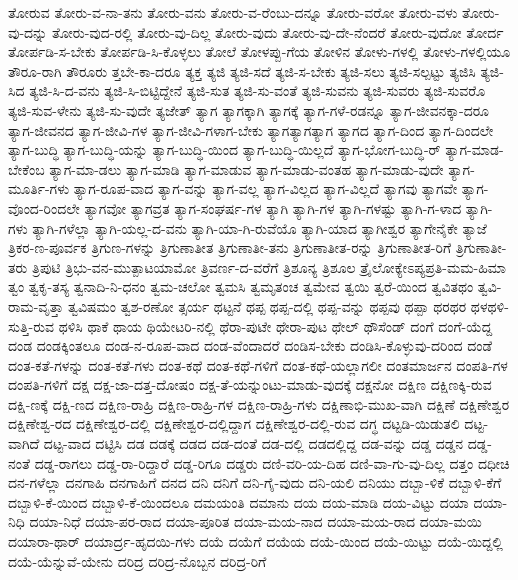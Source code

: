 {ತೋರುವ
ತೋರು-ವ-ನಾ-ತನು
ತೋರು-ವನು
ತೋರು-ವ-ರೆಂಬು-ದನ್ನೂ
ತೋರು-ವರೋ
ತೋರು-ವಳು
ತೋರು-ವು-ದನ್ನು
ತೋರು-ವುದ-ರಲ್ಲಿ
ತೋರು-ವು-ದಿಲ್ಲ
ತೋರು-ವುದು
ತೋರು-ವು-ದೇ-ನೆಂದರೆ
ತೋರು-ವುದೋ
ತೋರ್ದ
ತೋರ್ಪಡಿ-ಸ-ಬೇಕು
ತೋರ್ಪಡಿ-ಸಿ-ಕೊಳ್ಳಲು
ತೋಲೆ
ತೋಳಪ್ಪು-ಗೆಯ
ತೋಳಿನ
ತೋಳು-ಗಳಲ್ಲಿ
ತೋಳು-ಗಳಲ್ಲಿಯೂ
ತೌರೂ-ರಾಗಿ
ತೌರೂರು
ತ್ತಬೇ-ಕಾ-ದರೂ
ತ್ಯಕ್ತ
ತ್ಯಜಿ
ತ್ಯಜಿ-ಸದೆ
ತ್ಯಜಿ-ಸ-ಬೇಕು
ತ್ಯಜಿ-ಸಲು
ತ್ಯಜಿ-ಸಲ್ಪಟ್ಟು
ತ್ಯಜಿಸಿ
ತ್ಯಜಿ-ಸಿದ
ತ್ಯಜಿ-ಸಿ-ದ-ವನು
ತ್ಯಜಿ-ಸಿ-ಬಿಟ್ಟಿದ್ದೇನೆ
ತ್ಯಜಿ-ಸುತ
ತ್ಯಜಿ-ಸು-ವಂತೆ
ತ್ಯಜಿ-ಸುವನು
ತ್ಯಜಿ-ಸುವರು
ತ್ಯಜಿ-ಸುವರೊ
ತ್ಯಜಿ-ಸುವ-ಳೇನು
ತ್ಯಜಿ-ಸು-ವುದೇ
ತ್ಯಜೇತ್
ತ್ಯಾಗ
ತ್ಯಾಗಕ್ಕಾಗಿ
ತ್ಯಾಗಕ್ಕೆ
ತ್ಯಾಗ-ಗಳೆ-ರಡನ್ನೂ
ತ್ಯಾಗ-ಜೀವನಕ್ಕಾ-ದರೂ
ತ್ಯಾಗ-ಜೀವನದ
ತ್ಯಾಗ-ಜೀವಿ-ಗಳ
ತ್ಯಾಗ-ಜೀವಿ-ಗಳಾಗ-ಬೇಕು
ತ್ಯಾಗತ್ಯಾಗತ್ಯಾಗ
ತ್ಯಾಗದ
ತ್ಯಾಗ-ದಿಂದ
ತ್ಯಾಗ-ದಿಂದಲೇ
ತ್ಯಾಗ-ಬುದ್ಧಿ
ತ್ಯಾಗ-ಬುದ್ಧಿ-ಯನ್ನು
ತ್ಯಾಗ-ಬುದ್ಧಿ-ಯಿಂದ
ತ್ಯಾಗ-ಬುದ್ಧಿ-ಯಿಲ್ಲದೆ
ತ್ಯಾಗ-ಭೋಗ-ಬುದ್ಧಿ-ರ್
ತ್ಯಾಗ-ಮಾಡ-ಬೇಕೆಂಬ
ತ್ಯಾಗ-ಮಾ-ಡಲು
ತ್ಯಾಗ-ಮಾಡಿ
ತ್ಯಾಗ-ಮಾಡುವ
ತ್ಯಾಗ-ಮಾಡು-ವಂತಹ
ತ್ಯಾಗ-ಮಾಡು-ವುದೇ
ತ್ಯಾಗ-ಮೂರ್ತಿ-ಗಳು
ತ್ಯಾಗ-ರೂಪ-ವಾದ
ತ್ಯಾಗ-ವನ್ನು
ತ್ಯಾಗ-ವಲ್ಲ
ತ್ಯಾಗ-ವಿಲ್ಲದ
ತ್ಯಾಗ-ವಿಲ್ಲದೆ
ತ್ಯಾಗವು
ತ್ಯಾಗವೇ
ತ್ಯಾಗ-ವೊಂದ-ರಿಂದಲೇ
ತ್ಯಾಗವೋ
ತ್ಯಾಗವ್ರತ
ತ್ಯಾಗ-ಸಂಘರ್ಷ-ಗಳ
ತ್ಯಾಗಿ
ತ್ಯಾಗಿ-ಗಳ
ತ್ಯಾಗಿ-ಗಳಷ್ಟು
ತ್ಯಾಗಿ-ಗ-ಳಾದ
ತ್ಯಾಗಿ-ಗಳು
ತ್ಯಾಗಿ-ಗಳೆಲ್ಲಾ
ತ್ಯಾಗಿ-ಯಲ್ಲ-ದ-ವನು
ತ್ಯಾಗಿ-ಯಾ-ಗಿ-ರುವೆಯೊ
ತ್ಯಾಗಿ-ಯಾದ
ತ್ಯಾಗೀಶ್ವರ
ತ್ಯಾಗೇನೈಕೇ
ತ್ಯಾಜೆ
ತ್ರಿಕರ-ಣ-ಪೂರ್ವಕ
ತ್ರಿಗುಣ-ಗಳನ್ನು
ತ್ರಿಗುಣಾತೀತ
ತ್ರಿಗುಣಾತೀ-ತನು
ತ್ರಿಗುಣಾತೀತ-ರನ್ನು
ತ್ರಿಗುಣಾತೀತ-ರಿಗೆ
ತ್ರಿಗುಣಾತೀ-ತರು
ತ್ರಿಪುಟಿ
ತ್ರಿಭು-ವನ-ಮುತ್ಪಾಟಯಾಮೋ
ತ್ರಿವರ್ಣ-ದ-ವರೆಗೆ
ತ್ರಿಶೂನ್ಯ
ತ್ರಿಶೂಲ
ತ್ರೈಲೋಕ್ಯೇಽಪ್ಯಪ್ರತಿ-ಮಮ-ಹಿಮಾ
ತ್ವಂ
ತ್ವಕೃ-ತಸ್ಯ
ತ್ವನಾದಿ-ನಿ-ಧನಂ
ತ್ವಮ-ಚಲೋ
ತ್ವಮಸಿ
ತ್ವಮೃತಂಚ
ತ್ವಮೇವ
ತ್ವಯಿ
ತ್ವರೆ-ಯಿಂದ
ತ್ವವಿತಥಂ
ತ್ವವಿ-ರಾಮ-ವೃತ್ತಾ
ತ್ವವಿಷಮಂ
ತ್ವಶ-ರಣೋ
ತ್ಸರ್ಯ
ಥಟ್ಟನೆ
ಥಪ್ಪ
ಥಪ್ಪ-ದಲ್ಲಿ
ಥಪ್ಪ-ವನ್ನು
ಥಪ್ಪವು
ಥಪ್ಪಾ
ಥರಥರ
ಥಳಥಳಿ-ಸುತ್ತಿ-ರುವ
ಥಳಿಸಿ
ಥಾಕೆ
ಥಾಯ
ಥಿಯೇಟರಿ-ನಲ್ಲಿ
ಥೆರಾ-ಪುಟೇ
ಥೇರಾ-ಪುಟ
ಥೇಲ್
ಥೌಸೆಂಡ್
ದಂಗೆ
ದಂಗೆ-ಯೆದ್ದ
ದಂಡ
ದಂಡಕ್ಕಿಂತಲೂ
ದಂಡ-ನ-ರೂಪ-ವಾದ
ದಂಡ-ವೆಂದಾದರೆ
ದಂಡಿಸ-ಬೇಕು
ದಂಡಿಸಿ-ಕೊಳ್ಳುವು-ದರಿಂದ
ದಂಡೆ
ದಂತ-ಕತೆ-ಗಳನ್ನು
ದಂತ-ಕತೆ-ಗಳು
ದಂತ-ಕಥೆ
ದಂತ-ಕಥೆ-ಗಳಿಗೆ
ದಂತ-ಕಥೆ-ಯಲ್ಲಾಗಲೀ
ದಂತಮಾರ್ಜನ
ದಂಪತಿ-ಗಳ
ದಂಪತಿ-ಗಳಿಗೆ
ದಕ್ಷ
ದಕ್ಷ-ಜಾ-ದತ್ತ-ದೋಷಂ
ದಕ್ಷ-ತೆ-ಯನ್ನುಂಟು-ಮಾಡು-ವುದಕ್ಕೆ
ದಕ್ಷನೋ
ದಕ್ಷಿಣ
ದಕ್ಷಿಣಕ್ಕಿ-ರುವ
ದಕ್ಷಿ-ಣಕ್ಕೆ
ದಕ್ಷಿ-ಣದ
ದಕ್ಷಿಣ-ರಾಹ್ರಿ
ದಕ್ಷಿಣ-ರಾಹ್ರಿ-ಗಳ
ದಕ್ಷಿಣ-ರಾಹ್ರಿ-ಗಳು
ದಕ್ಷಿಣಾಭಿ-ಮುಖ-ವಾಗಿ
ದಕ್ಷಿಣೆ
ದಕ್ಷಿಣೇಶ್ವರ
ದಕ್ಷಿಣೇಶ್ವ-ರದ
ದಕ್ಷಿಣೇಶ್ವರ-ದಲ್ಲಿ
ದಕ್ಷಿಣೇಶ್ವರ-ದಲ್ಲಿದ್ದಾಗ
ದಕ್ಷಿಣೇಶ್ವರ-ದಲ್ಲಿ-ರುವ
ದಗ್ಧ
ದಟ್ಟಡಿ-ಯಿಡುತಲಿ
ದಟ್ಟ-ವಾಗಿದೆ
ದಟ್ಟ-ವಾದ
ದಟ್ಟಿಸಿ
ದಡ
ದಡಕ್ಕೆ
ದಡದ
ದಡ-ದಂತೆ
ದಡ-ದಲ್ಲಿ
ದಡದಲ್ಲಿದ್ದ
ದಡ-ವನ್ನು
ದಡ್ಡ
ದಡ್ಡನ
ದಡ್ಡ-ನಂತೆ
ದಡ್ಡ-ರಾಗಲು
ದಡ್ಡ-ರಾ-ರಿದ್ದಾರೆ
ದಡ್ಡ-ರಿಗೂ
ದಡ್ಡರು
ದಣಿ-ವರಿ-ಯ-ದಿಹ
ದಣಿ-ವಾ-ಗು-ವು-ದಿಲ್ಲ
ದತ್ತಂ
ದಧೀಚಿ
ದನ-ಗಳೆಲ್ಲಾ
ದನಗಾಹಿ
ದನಗಾಹಿಗೆ
ದನದ
ದನಿ
ದನಿಗೆ
ದನಿ-ಗೈ-ವುದು
ದನಿ-ಯಲಿ
ದನಿಯು
ದಬ್ಬಾ-ಳಿಕೆ
ದಬ್ಬಾಳಿ-ಕೆಗೆ
ದಬ್ಬಾಳಿ-ಕೆ-ಯಿಂದ
ದಬ್ಬಾಳಿ-ಕೆ-ಯಿಂದಲೂ
ದಮಯಂತಿ
ದಮಾನು
ದಯ
ದಯ-ಮಾಡಿ
ದಯ-ವಿಟ್ಟು
ದಯಾ
ದಯಾ-ನಿಧಿ
ದಯಾ-ನಿಧೆ
ದಯಾ-ಪರ-ರಾದ
ದಯಾ-ಪೂರಿತ
ದಯಾ-ಮಯ-ನಾದ
ದಯಾ-ಮಯ-ರಾದ
ದಯಾ-ಮಯಿ
ದಯಾರಾ-ಥಾರ್
ದಯಾರ್ದ್ರ-ಹೃದಯಿ-ಗಳು
ದಯೆ
ದಯೆಗೆ
ದಯೆಯ
ದಯೆ-ಯಿಂದ
ದಯೆ-ಯಿಟ್ಟು
ದಯೆ-ಯಿದ್ದಲ್ಲಿ
ದಯೆ-ಯೆನ್ನುವೆ-ಯೇನು
ದರಿದ್ರ
ದರಿದ್ರ-ನೊಬ್ಬನ
ದರಿದ್ರ-ರಿಗೆ
}
